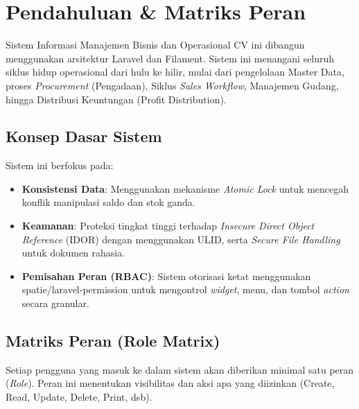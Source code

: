 \chapter{Pendahuluan \& Matriks Peran}

Sistem Informasi Manajemen Bisnis dan Operasional CV ini dibangun menggunakan arsitektur Laravel dan Filament. Sistem ini menangani seluruh siklus hidup operasional dari hulu ke hilir, mulai dari pengelolaan Master Data, proses \textit{Procurement} (Pengadaan), Siklus \textit{Sales Workflow}, Manajemen Gudang, hingga Distribusi Keuntungan (Profit Distribution).

\section{Konsep Dasar Sistem}
Sistem ini berfokus pada:
\begin{itemize}
    \item \textbf{Konsistensi Data}: Menggunakan mekanisme \textit{Atomic Lock} untuk mencegah konflik manipulasi saldo dan stok ganda.
    \item \textbf{Keamanan}: Proteksi tingkat tinggi terhadap \textit{Insecure Direct Object Reference} (IDOR) dengan menggunakan ULID, serta \textit{Secure File Handling} untuk dokumen rahasia.
    \item \textbf{Pemisahan Peran (RBAC)}: Sistem otorisasi ketat menggunakan spatie/laravel-permission untuk mengontrol \textit{widget}, menu, dan tombol \textit{action} secara granular.
\end{itemize}

\section{Matriks Peran (Role Matrix)}

Setiap pengguna yang masuk ke dalam sistem akan diberikan minimal satu peran (\textit{Role}). Peran ini menentukan visibilitas dan aksi apa yang diizinkan (Create, Read, Update, Delete, Print, dsb).

